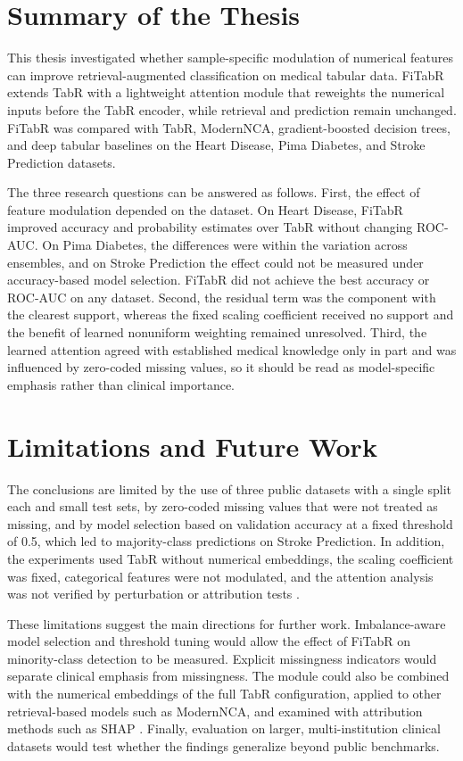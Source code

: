 \documentclass[11pt,a4paper,oneside, openany, reqno, chapter, nokorean]{oblivoir}
\theoremstyle{definition}
\theoremstyle{remark}
\numberwithin{equation}{chapter}
\theoremstyle{definition}
\theoremstyle{remark}
\theoremstyle{definition}
\begin{document}
\section{Summary of the Thesis}

This thesis investigated whether sample-specific modulation of numerical
features can improve retrieval-augmented classification on medical tabular
data. FiTabR extends TabR with a lightweight attention module that reweights
the numerical inputs before
the TabR encoder, while retrieval and prediction remain unchanged. FiTabR was
compared with TabR, ModernNCA, gradient-boosted decision trees, and deep
tabular baselines on the Heart Disease, Pima Diabetes, and Stroke Prediction
datasets.

The three research questions can be answered as follows. First, the effect of
feature modulation depended on the dataset. On Heart Disease, FiTabR improved
accuracy and probability estimates over TabR without changing ROC-AUC. On Pima
Diabetes, the differences were within the variation across ensembles, and on
Stroke Prediction the effect could not be measured under accuracy-based model
selection. FiTabR did not achieve the best accuracy or ROC-AUC on any dataset.
Second, the residual term was the component with the clearest support,
whereas the fixed scaling coefficient received no support and the benefit of
learned nonuniform weighting remained unresolved. Third, the learned attention
agreed with established medical knowledge only in part and was influenced by
zero-coded missing values, so it should be read as model-specific emphasis
rather than clinical importance.

\section{Limitations and Future Work}
\label{sec:future-work}

The conclusions are limited by the use of three public datasets with a single
split each and small test sets, by zero-coded missing values that were not
treated as missing, and by model selection based on validation accuracy at a
fixed threshold of 0.5, which led to majority-class predictions on Stroke
Prediction. In addition, the experiments used TabR without numerical
embeddings, the scaling coefficient was fixed, categorical features were not
modulated, and the attention analysis was not verified by perturbation or
attribution tests \cite{jain2019attention,wiegreffe2019attention}.

These limitations suggest the main directions for further work. Imbalance-aware
model selection and threshold tuning would allow the effect of FiTabR on
minority-class detection to be measured. Explicit missingness indicators would
separate clinical emphasis from missingness. The module could also be combined
with the numerical embeddings of the full TabR configuration, applied to other
retrieval-based models such as ModernNCA, and examined with attribution
methods such as SHAP \cite{lundberg2017shap}. Finally, evaluation on larger,
multi-institution clinical datasets would test whether the findings
generalize beyond public benchmarks.
\end{document}
